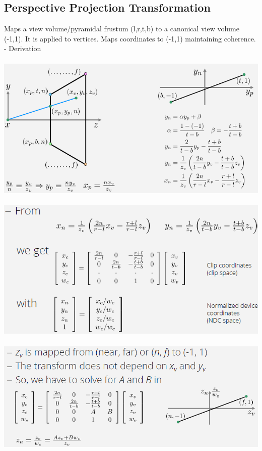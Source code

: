 \documentclass{article}
\begin{document}
\subsection{Perspective Projection Transformation}
Maps a view volume/pyramidal frustum (l,r,t,b) to a canonical view volume (-1,1). It is applied to vertices. Maps coordinates to (-1,1) maintaining coherence.\\

- Derivation \\\\
\includegraphics[scale=0.6]{image41.png}\\\\
\includegraphics[scale=0.6]{image42.png}\\\\
\includegraphics[scale=0.6]{image43.png}\\\\
\end{document}
